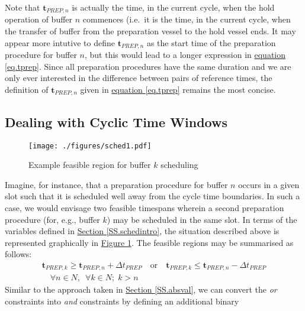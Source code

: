 Note that $\boldsymbol{t}_{\mathit{PREP},n}$ is actually the time, in the
current cycle, when the hold operation of buffer $n$ commences (i.e.\ it is the
time, in the current cycle, when the transfer of buffer from the preparation
vessel to the hold vessel ends.  It may appear more intutive to define
$\boldsymbol{t}_{\mathit{PREP},n}$ as the start time of the preparation
procedure for buffer $n$, but this would lead to a longer expression in
\hyperref[eq.tprep]{equation \ref*{eq.tprep}}.
Since all preparation procedures have the same duration and we are only ever
interested in the difference between pairs of reference times, the definition
of $\boldsymbol{t}_{\mathit{PREP},n}$ given in
\hyperref[eq.tprep]{equation \ref*{eq.tprep}} remains
the most concise.

\subsection{Dealing with Cyclic Time Windows}
\label{SS.cyclic}
\begin{figure}
    \centering
    \texttt{[image: ./figures/sched1.pdf]}
    \caption{Example feasible region for buffer $k$ scheduling}
    \label{fig.sched1}
\end{figure}
Imagine, for instance, that a preparation procedure for buffer $n$ occurs in a
given slot such that it is scheduled well away from the cycle time boundaries.
In such a case, we would envisage two feasible timespans wherein a second
preparation procedure (for, e.g., buffer $k$) may be scheduled in the same
slot.
In terms of the variables defined in 
\hyperref[SS.schedintro]{Section \ref*{SS.schedintro}}, the situation described
above is represented graphically in 
\hyperref[fig.sched1]{Figure \ref*{fig.sched1}}.
The feasible regions may be summarised as follows:
\begin{equation}
    \begin{split}
        \boldsymbol{t}_{\mathit{PREP},k} \ge \boldsymbol{t}_{\mathit{PREP},n} 
        + \Delta t_{\mathit{PREP}} \quad \text{or} \quad 
        \boldsymbol{t}_{\mathit{PREP},k} \le \boldsymbol{t}_{\mathit{PREP},n}
        - \Delta t_{\mathit{PREP}}\\
        \quad \forall n \in N, \enspace \forall k \in N; \; k > n
    \end{split}    
    \label{eq.k0}
\end{equation}
Similar to the approach taken in 
\hyperref[SS.absval]{Section \ref*{SS.absval}}, we can convert the \emph{or}
constraints into \emph{and} constraints by defining an additional binary
